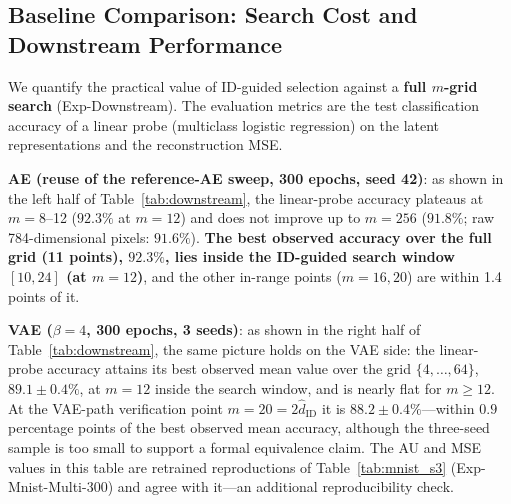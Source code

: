 \documentclass[make,article,submit,pdftex,moreauthors]{Definitions/mdpi}
\newcommand{\hatdID}{\hat{d}_{\mathrm{ID}}}
\begin{document}
\subsection{Baseline Comparison: Search Cost and Downstream Performance}\label{sec:exp_downstream}

We quantify the practical value of ID-guided selection against a
\textbf{full $m$-grid search} (Exp-Downstream).
The evaluation metrics are the test classification accuracy of a linear
probe (multiclass logistic regression) on the latent representations and the
reconstruction MSE.

\textbf{AE (reuse of the reference-AE sweep, 300 epochs, seed 42)}:
as shown in the left half of Table~\ref{tab:downstream},
the linear-probe accuracy plateaus at $m = 8$--12 ($92.3\%$ at $m = 12$)
and does not improve up to $m = 256$ ($91.8\%$; raw 784-dimensional pixels:
$91.6\%$).
\textbf{The best observed accuracy over the full grid (11 points),
$92.3\%$, lies inside the ID-guided search window $[10, 24]$ (at
$m = 12$)},
and the other in-range points ($m = 16, 20$) are within 1.4 points of it.

\textbf{VAE ($\beta = 4$, 300 epochs, 3 seeds)}:
as shown in the right half of Table~\ref{tab:downstream}, the same picture
holds on the VAE side: the linear-probe accuracy attains its best observed
mean value over the grid $\{4, \ldots, 64\}$, $89.1 \pm 0.4\%$, at $m = 12$
inside the search window, and is nearly flat for $m \geq 12$.
At the VAE-path verification point $m = 20 = 2\hatdID$ it is
$88.2 \pm 0.4\%$---within $0.9$ percentage points of the best observed mean
accuracy, although the three-seed sample is too small to support a formal
equivalence claim.
The AU and MSE values in this table are retrained reproductions of
Table~\ref{tab:mnist_s3} (Exp-Mnist-Multi-300) and agree with it---an
additional reproducibility check.
\end{document}
